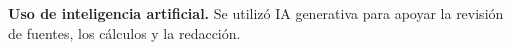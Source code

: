 \par
{\footnotesize\textbf{Uso de inteligencia artificial.} Se utilizó IA generativa para apoyar la revisión de fuentes, los cálculos y la redacción.\par}
